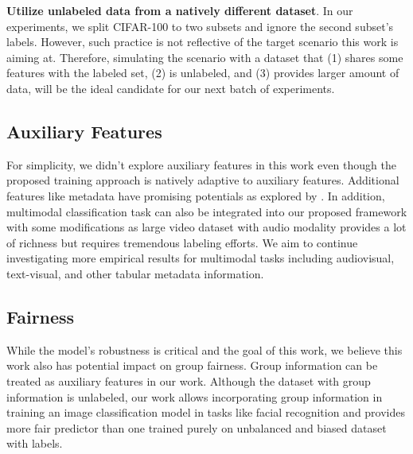 \documentclass{article}
\begin{document}
\textbf{Utilize unlabeled data from a natively different dataset}. In our experiments, we split CIFAR-100 to two subsets and ignore the second 
subset's labels. However, such practice is not reflective of the target 
scenario this work is aiming at. Therefore, simulating the scenario with 
a dataset that (1) shares some features with the labeled set, 
(2) is unlabeled, and (3) provides larger amount of data, will be the 
ideal candidate for our next batch of experiments.


\subsection{Auxiliary Features}
For simplicity, we didn't explore auxiliary features in this work even 
though the proposed training approach is natively adaptive to auxiliary 
features. Additional features like metadata have promising potentials as explored 
by \citep{mcauley2012image}. In addition, multimodal classification task can 
also be integrated into our proposed framework with some modifications as 
large video dataset with audio modality provides a lot of richness but 
requires tremendous labeling efforts. We aim to continue investigating 
more empirical results for multimodal tasks including audiovisual, text-visual,
and other tabular metadata information.

\subsection{Fairness}
While the model's robustness is critical and the goal of this work, 
we believe this work also has potential impact on group fairness. Group 
information can be treated as auxiliary features in our work. Although 
the dataset with group information is unlabeled, our work allows incorporating 
group information in training an image classification model in tasks like 
facial recognition and provides more fair predictor than one trained purely 
on unbalanced and biased dataset with labels.

\newpage

\end{document}
